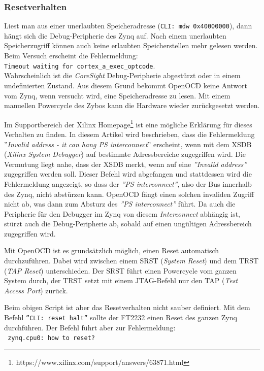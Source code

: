 \subsubsection{Resetverhalten}
Liest man aus einer unerlaubten Speicheradresse (\texttt{CLI: mdw 0x40000000}), dann hängt sich die Debug-Peripherie des Zynq auf.
Nach einem unerlaubten Speicherzugriff können auch keine erlaubten Speicherstellen mehr gelesen werden.
Beim Versuch erscheint die Fehlermeldung:\\
\texttt{Timeout waiting for cortex\_a\_exec\_optcode}.\\
Wahrscheinlich ist die \textit{CoreSight} Debug-Peripherie abgestürzt oder in einem undefinierten Zustand.
Aus diesem Grund bekommt OpenOCD keine Antwort vom Zynq, wenn versucht wird, eine Speicheradresse zu lesen.
Mit einem manuellen Powercycle des Zybos kann die Hardware wieder zurückgesetzt werden.

Im Supportbereich der Xilinx Homepage\footnote{https://www.xilinx.com/support/answers/63871.html} ist eine mögliche Erklärung für dieses Verhalten zu finden.
In diesem Artikel wird beschrieben, dass die Fehlermeldung ''\textit{Invalid address - it can hang PS interconnect}'' erscheint, wenn mit dem XSDB (\textit{Xilinx System Debugger}) auf bestimmte Adressbereiche zugegriffen wird.
Die Vermutung liegt nahe, dass der XSDB merkt, wenn auf eine \textit{''Invalid address''} zugegriffen werden soll.
Dieser Befehl wird abgefangen und stattdessen wird die Fehlermeldung angezeigt, so dass der \textit{''PS interconnect''}, also der Bus innerhalb des Zynq, nicht abstürzen kann.
OpenOCD fängt einen solchen invaliden Zugriff nicht ab, was dann zum Absturz des \textit{''PS interconnect''} führt.
Da auch die Peripherie für den Debugger im Zynq von diesem \textit{Interconnect} abhängig ist, stürzt auch die Debug-Peripherie ab, sobald auf einen ungültigen Adressbereich zugegriffen wird.

Mit OpenOCD ist es grundsätzlich möglich, einen Reset automatisch durchzuführen.
Dabei wird zwischen einem SRST (\textit{System Reset}) und dem TRST (\textit{TAP Reset}) unterschieden.
Der SRST führt einen Powercycle vom ganzen System durch, der TRST setzt mit einem JTAG-Befehl nur den TAP (\textit{Test Access Port}) zurück.

Beim obigen Script ist aber das Resetverhalten nicht sauber definiert.
Mit dem Befehl \texttt{''CLI: reset halt''} sollte der FT2232 einen Reset des ganzen Zynq durchführen.
Der Befehl führt aber zur Fehlermeldung:\\
\texttt{
zynq.cpu0: how to reset?\\
}

